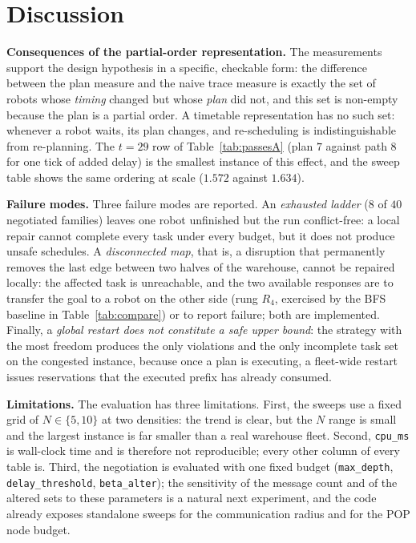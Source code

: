 \documentclass[10pt,a4paper]{article}
\newcommand{\code}[1]{\texttt{#1}}
\begin{document}
\section{Discussion}\label{sec:discussion}

\textbf{Consequences of the partial-order representation.}  The measurements
support the design hypothesis in a specific, checkable form: the difference
between the plan measure and the naive trace measure is exactly the set of
robots whose \emph{timing} changed but whose \emph{plan} did not, and this
set is non-empty because the plan is a partial order.  A timetable
representation has no such set: whenever a robot waits, its plan changes, and
re-scheduling is indistinguishable from re-planning.  The $t=29$ row of
Table~\ref{tab:passesA} (plan $7$ against path $8$ for one tick of added
delay) is the smallest instance of this effect, and the sweep table shows the
same ordering at scale ($1.572$ against $1.634$).

\textbf{Failure modes.}  Three failure modes are reported.  An \emph{exhausted
ladder} ($8$ of $40$ negotiated families) leaves one robot unfinished but the
run conflict-free: a local repair cannot complete every task under every
budget, but it does not produce unsafe schedules.  A \emph{disconnected map},
that is, a disruption that permanently removes the last edge between two
halves of the warehouse, cannot be repaired locally: the affected task is
unreachable, and the two available responses are to transfer the goal to a
robot on the other side (rung $R_4$, exercised by the BFS baseline in
Table~\ref{tab:compare}) or to report failure; both are implemented.  Finally,
a \emph{global restart does not constitute a safe upper bound}: the strategy
with the most freedom produces the only violations and the only incomplete
task set on the congested instance, because once a plan is executing, a
fleet-wide restart issues reservations that the executed prefix has already
consumed.

\textbf{Limitations.}  The evaluation has three limitations.  First, the
sweeps use a fixed grid of $N \in \{5, 10\}$ at two densities: the trend is
clear, but the $N$ range is small and the largest instance is far smaller
than a real warehouse fleet.  Second, \code{cpu\_ms} is wall-clock time and
is therefore not reproducible; every other column of every table is.  Third,
the negotiation is evaluated with one fixed budget (\code{max\_depth},
\code{delay\_threshold}, \code{beta\_alter}); the sensitivity of the message
count and of the altered sets to these parameters is a natural next
experiment, and the code already exposes standalone sweeps for the
communication radius and for the POP node budget.
\end{document}

